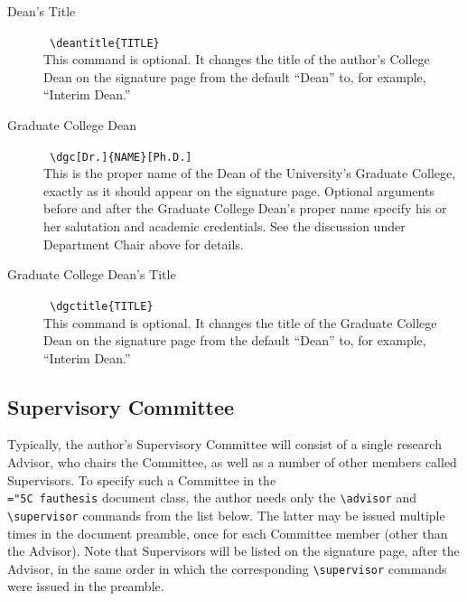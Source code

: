 \documentclass[11pt]{article}
\newcommand\code[1]{{\normalfont\texttt{\let\dv\textsl\chardef\\="5C #1}}}
\begin{document}
\begin{description}
\item[\llap{*}Dean's Title] \dotfill\ \verb=\deantitle{TITLE}=\\
This command is optional.  It changes the title of the author's College Dean on the signature page from the default ``Dean'' to, for example, ``Interim Dean.''

\item[Graduate College Dean] \dotfill\ \verb=\dgc[Dr.]{NAME}[Ph.D.]=\\
This is the proper name of the Dean of the University's Graduate College, exactly as it should appear on the signature page.  Optional arguments before and after the Graduate College Dean's proper name specify his or her salutation and academic credentials.  See the discussion under Department Chair above for details.

\item[\llap{*}Graduate College Dean's Title] \dotfill\ \verb=\dgctitle{TITLE}=\\
This command is optional.  It changes the title of the Graduate College Dean on the signature page from the default ``Dean'' to, for example, ``Interim Dean.''

\end{description}



\subsection{Supervisory Committee}\label{committee}

Typically, the author's Supervisory Committee will consist of a single research Advisor, who chairs the Committee, as well as a number of other members called Supervisors.  To specify such a Committee in the \code{fauthesis} document class, the author needs only the \verb=\advisor= and \verb=\supervisor= commands from the list below.  The latter may be issued multiple times in the document preamble, once for each Committee member (other than the Advisor).  Note that Supervisors will be listed on the signature page, after the Advisor, in the same order in which the corresponding \verb=\supervisor= commands were issued in the preamble.
\end{document}
